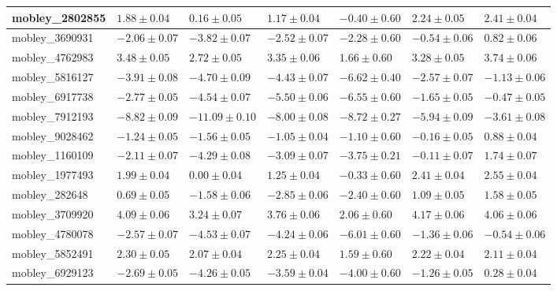 \documentclass{article}
\begin{document}
\begin{landscape}
\begin{longtable}{|l{3.0cm}|l{3.0cm}|l{3.2cm}|l{3.6cm}|l{3.0cm}|l{3.0cm}|l{3.0cm}|}
mobley\_2802855	&	$	1.88	\pm	0.04	$	&	$	0.16	\pm	0.05	$	&	$	1.17	\pm	0.04	$	&	$	-0.40	\pm	0.60	$	&	$	2.24	\pm	0.05	$	&	$	2.41	\pm	0.04	$	\\ \hline
mobley\_3690931	&	$	-2.06	\pm	0.07	$	&	$	-3.82	\pm	0.07	$	&	$	-2.52	\pm	0.07	$	&	$	-2.28	\pm	0.60	$	&	$	-0.54	\pm	0.06	$	&	$	0.82	\pm	0.06	$	\\ \hline
mobley\_4762983	&	$	3.48	\pm	0.05	$	&	$	2.72	\pm	0.05	$	&	$	3.35	\pm	0.06	$	&	$	1.66	\pm	0.60	$	&	$	3.28	\pm	0.05	$	&	$	3.74	\pm	0.06	$	\\ \hline
mobley\_5816127	&	$	-3.91	\pm	0.08	$	&	$	-4.70	\pm	0.09	$	&	$	-4.43	\pm	0.07	$	&	$	-6.62	\pm	0.40	$	&	$	-2.57	\pm	0.07	$	&	$	-1.13	\pm	0.06	$	\\ \hline
mobley\_6917738	&	$	-2.77	\pm	0.05	$	&	$	-4.54	\pm	0.07	$	&	$	-5.50	\pm	0.06	$	&	$	-6.55	\pm	0.60	$	&	$	-1.65	\pm	0.05	$	&	$	-0.47	\pm	0.05	$	\\ \hline
mobley\_7912193	&	$	-8.82	\pm	0.09	$	&	$	-11.09	\pm	0.10	$	&	$	-8.00	\pm	0.08	$	&	$	-8.72	\pm	0.27	$	&	$	-5.94	\pm	0.09	$	&	$	-3.61	\pm	0.08	$	\\ \hline
mobley\_9028462	&	$	-1.24	\pm	0.05	$	&	$	-1.56	\pm	0.05	$	&	$	-1.05	\pm	0.04	$	&	$	-1.10	\pm	0.60	$	&	$	-0.16	\pm	0.05	$	&	$	0.88	\pm	0.04	$	\\ \hline
mobley\_1160109	&	$	-2.11	\pm	0.07	$	&	$	-4.29	\pm	0.08	$	&	$	-3.09	\pm	0.07	$	&	$	-3.75	\pm	0.21	$	&	$	-0.11	\pm	0.07	$	&	$	1.74	\pm	0.07	$	\\ \hline
mobley\_1977493	&	$	1.99	\pm	0.04	$	&	$	0.00	\pm	0.04	$	&	$	1.25	\pm	0.04	$	&	$	-0.33	\pm	0.60	$	&	$	2.41	\pm	0.04	$	&	$	2.55	\pm	0.04	$	\\ \hline
mobley\_282648	&	$	0.69	\pm	0.05	$	&	$	-1.58	\pm	0.06	$	&	$	-2.85	\pm	0.06	$	&	$	-2.40	\pm	0.60	$	&	$	1.09	\pm	0.05	$	&	$	1.58	\pm	0.05	$	\\ \hline
mobley\_3709920	&	$	4.09	\pm	0.06	$	&	$	3.24	\pm	0.07	$	&	$	3.76	\pm	0.06	$	&	$	2.06	\pm	0.60	$	&	$	4.17	\pm	0.06	$	&	$	4.06	\pm	0.06	$	\\ \hline
mobley\_4780078	&	$	-2.57	\pm	0.07	$	&	$	-4.53	\pm	0.07	$	&	$	-4.24	\pm	0.06	$	&	$	-6.01	\pm	0.60	$	&	$	-1.36	\pm	0.06	$	&	$	-0.54	\pm	0.06	$	\\ \hline
mobley\_5852491	&	$	2.30	\pm	0.05	$	&	$	2.07	\pm	0.04	$	&	$	2.25	\pm	0.04	$	&	$	1.59	\pm	0.60	$	&	$	2.22	\pm	0.04	$	&	$	2.11	\pm	0.04	$	\\ \hline
mobley\_6929123	&	$	-2.69	\pm	0.05	$	&	$	-4.26	\pm	0.05	$	&	$	-3.59	\pm	0.04	$	&	$	-4.00	\pm	0.60	$	&	$	-1.26	\pm	0.05	$	&	$	0.28	\pm	0.04	$	\\ \hline

\end{longtable}
\end{landscape}
\end{document}
